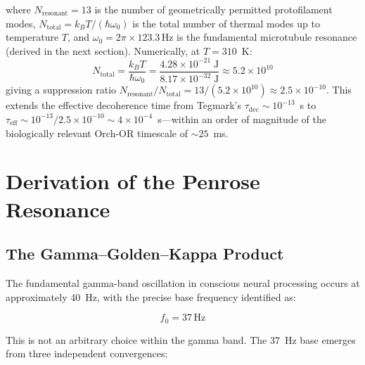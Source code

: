 \documentclass[12pt,a4paper]{article}
\theoremstyle{plain}
\theoremstyle{definition}
\newcommand{\Hz}{\,\mathrm{Hz}}
\begin{document}
\noindent where $N_{\mathrm{resonant}} = 13$ is the number of geometrically permitted protofilament modes, $N_{\mathrm{total}} = k_BT/(\hbar\omega_0)$ is the total number of thermal modes up to temperature $T$, and $\omega_0 = 2\pi \times 123.3\Hz$ is the fundamental microtubule resonance (derived in the next section). Numerically, at $T = 310$~K:
\begin{equation}
N_{\mathrm{total}} = \frac{k_B T}{\hbar\omega_0} = \frac{4.28 \times 10^{-21}\;\mathrm{J}}{8.17 \times 10^{-32}\;\mathrm{J}} \approx 5.2 \times 10^{10}
\end{equation}
\noindent giving a suppression ratio $N_{\mathrm{resonant}}/N_{\mathrm{total}} = 13/(5.2 \times 10^{10}) \approx 2.5 \times 10^{-10}$. This extends the effective decoherence time from Tegmark's $\tau_{\mathrm{dec}} \sim 10^{-13}$~s to $\tau_{\mathrm{eff}} \sim 10^{-13}/2.5 \times 10^{-10} \sim 4 \times 10^{-4}$~s---within an order of magnitude of the biologically relevant Orch-OR timescale of $\sim 25$~ms.

\section{Derivation of the Penrose Resonance}
\label{sec:resonance}

\subsection{The Gamma--Golden--Kappa Product}

The fundamental gamma-band oscillation in conscious neural processing occurs at approximately 40~Hz, with the precise base frequency identified as:

\begin{equation}
f_0 = 37\Hz
\end{equation}

\noindent This is not an arbitrary choice within the gamma band. The 37~Hz base emerges from three independent convergences:
\end{document}
